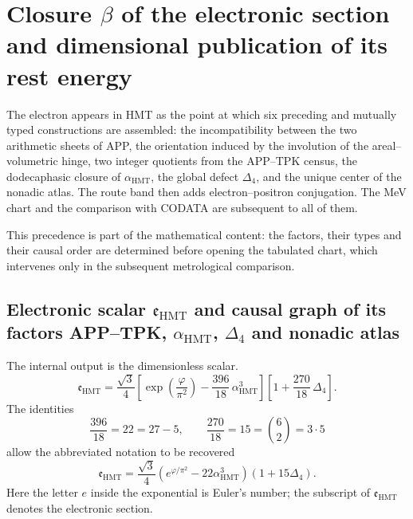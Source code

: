 \section{Closure \(\beta\) of the electronic section and dimensional publication of its rest energy}
\label{chap:biografia-electron-rev6}

The electron appears in HMT as the point at which six
preceding and mutually typed constructions are assembled: the incompatibility between
the two arithmetic sheets of APP, the orientation induced by the involution
of the areal--volumetric hinge, two integer quotients from the APP--TPK census,
the dodecaphasic
closure of \(\alpha_{\mathrm{HMT}}\), the global defect
\(\Delta_4\), and the unique center of the nonadic atlas. The route band then adds
electron--positron conjugation. The MeV chart and the comparison
with CODATA are subsequent to all of them.

This precedence is part of the mathematical content: the factors, their
types and their causal order are determined before opening the tabulated chart, which
intervenes only in the subsequent metrological comparison.

\subsection{Electronic scalar \(\mathfrak e_{\mathrm{HMT}}\) and causal graph of its factors APP–TPK, \(\alpha_{\mathrm{HMT}}\), \(\Delta_4\) and nonadic atlas}

The internal output is the dimensionless scalar.
\begin{equation}
 \label{eq:electron-holografico-rev6}
 \boxed{
 \mathfrak e_{\mathrm{HMT}}
 =
 \frac{\sqrt3}{4}
 \left[
 \exp\!\left(\frac{\varphi}{\pi^2}\right)
 -\frac{396}{18}\,\alpha_{\mathrm{HMT}}^3
 \right]
 \left[
 1+\frac{270}{18}\,\Delta_4
 \right].}
\end{equation}
The identities
\[
 \frac{396}{18}=22=27-5,
 \qquad
 \frac{270}{18}=15=\binom62=3\cdot5
 \]
allow the abbreviated notation to be recovered
\[
 \mathfrak e_{\mathrm{HMT}}
 =
 \frac{\sqrt3}{4}
 \left(e^{\varphi/\pi^2}-22\alpha_{\mathrm{HMT}}^3\right)
 (1+15\Delta_4).
\]
Here the letter \(e\) inside the exponential is Euler's number; the
subscript of \(\mathfrak e_{\mathrm{HMT}}\) denotes the electronic section.

